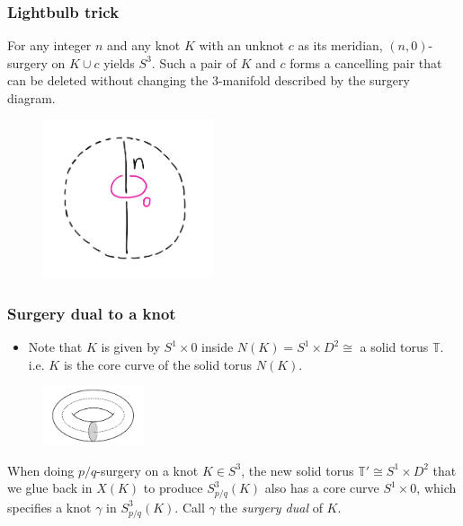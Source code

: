 \documentclass{beamer}
\theoremstyle{ex}
\theoremstyle{rem}
\begin{document}
\begin{frame}
	\frametitle{Lightbulb trick}
	\begin{theorem}
		For any integer $n$ and any knot $K$ with an unknot $c$ as its meridian, $(n, 0)$-surgery on $K \cup c$ yields $S^3$. Such a pair of $K$ and $c$ forms a cancelling pair that can be deleted without changing the $3$-manifold described by the surgery diagram.
	\end{theorem}
	\begin{figure}
		\centering
		\includegraphics[width=50mm]{Kc.jpg}
	\end{figure}
\end{frame}

\begin{frame}
	\frametitle{Surgery dual to a knot}
	\begin{itemize}
		\item Note that $K$ is given by $S^1 \times {0}$ inside $N(K) = S^1 \times D^2 \cong$ a solid torus $\mathbb{T}$. i.e. $K$ is the core curve of the solid torus $N(K)$. 
	\end{itemize}
	\begin{figure}
		\centering
		\includegraphics[width=30mm]{core.png}
	\end{figure}
	\begin{definition}
		When doing $p/q$-surgery on a knot $K \in S^3$, the new solid torus $\mathbb{T'} \cong S^1 \times D^2$ that we glue back in $X(K)$ to produce $S^3_{p/q}(K)$ also has a core curve $S^1 \times {0}$, which specifies a knot $\gamma$ in $S^3_{p/q}(K)$. Call $\gamma$ the \textit{surgery dual} of $K$.
	\end{definition}		
\end{frame}
\end{document}
